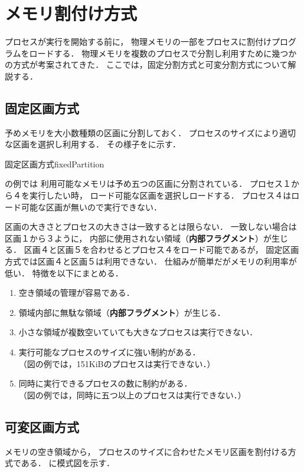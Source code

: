 \chapter{メモリ割付け方式}
プロセスが実行を開始する前に，
物理メモリの一部をプロセスに割付けプログラムをロードする．
物理メモリを複数のプロセスで分割し利用すために幾つかの方式が考案されてきた．
ここでは，固定分割方式と可変分割方式について解説する．

\section{固定区画方式}
予めメモリを大小数種類の区画に分割しておく．
プロセスのサイズにより適切な区画を選択し利用する．
その様子をに示す．

{固定区画方式}{fixedPartition}

の例では
利用可能なメモリは予め五つの区画に分割されている．
プロセス１から４を実行したい時，
ロード可能な区画を選択しロードする．
プロセス４はロード可能な区画が無いので実行できない．

区画の大きさとプロセスの大きさは一致するとは限らない．
一致しない場合は区画１から３ように，
内部に使用されない領域（{\bf 内部フラグメント}）が生じる．
区画４と区画５を合わせるとプロセス４をロード可能であるが，
固定区画方式では区画４と区画５は利用できない．
仕組みが簡単だがメモリの利用率が低い．
特徴を以下にまとめる．

\begin{enumerate}
\item 空き領域の管理が容易である．
\item 領域内部に無駄な領域（{\bf 内部フラグメント}）が生じる．
\item 小さな領域が複数空いていても大きなプロセスは実行できない．
\item 実行可能なプロセスのサイズに強い制約がある．\\
（図の例では，151KiBのプロセスは実行できない．）
\item 同時に実行できるプロセスの数に制約がある．\\
（図の例では，同時に五つ以上のプロセスは実行できない．）
\end{enumerate}

\section{可変区画方式}
メモリの空き領域から，
プロセスのサイズに合わせたメモリ区画を割付ける方式である．
に模式図を示す．


